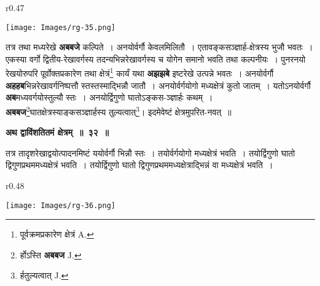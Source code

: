 \documentclass[11pt, openany]{book}
\begin{document}
\begin{wrapfigure}{r}{0.47\textwidth}
\vspace{-10mm}
\begin{center}
\texttt{[image: Images/rg-35.png]}
\end{center}
\vspace{-8mm}
\end{wrapfigure}

तत्र तथा मध्यरेखे \textbf{अबबजे} कल्पिते~। अनयोर्वर्गौ केवलमिलितौ~। एतावङ्कसञ्ज्ञार्ह-क्षेत्रस्य भुजौ भवतः~। एकस्या वर्गो द्वितीय-रेखावर्गस्य तदन्यभिन्नरेखावर्गस्य  च योगेन समानो भवति तथा कल्पनीयः~। पुनरनयो रेखयोरुपरि पूर्वोक्तप्रकारेण तथा क्षेत्रं\renewcommand{\thefootnote}{२}\footnote{पूर्वक्रमप्रकारेण क्षेत्रं {\en A.}} कार्यं यथा \textbf{अझझबे} इष्टरेखे उत्पन्ने भवतः~। अनयोर्वर्गौ \textbf{अहहब}भिन्नरेखावर्गनिष्पत्तौ स्तस्तस्माद्भिन्नौ जातौ~। अनयोर्वर्गयोगो मध्यक्षेत्रं कुतो जातम्~। यतोऽनयोर्वर्गौ \textbf{अब}मध्यवर्गयोस्तुल्यौ स्तः~। अनयोर्द्विगुणो घातोऽङ्कस-ञ्ज्ञार्हः कथम्~। \textbf{अबबज}\renewcommand{\thefootnote}{३}\footnote{र्होऽस्ति \textbf{अबबज} {\en J.}}घातक्षेत्रस्याङ्कसञ्ज्ञार्हस्य तुल्यत्वात्\renewcommand{\thefootnote}{४}\footnote{र्हतुल्यत्वात् {\en J.}}\;। इदमेवेष्टं क्षेत्रमुपरित-नवत्~॥ 
\vspace{2mm}

\begin{center}
\textbf{\large अथ द्वाविंशतितमं क्षेत्रम्~॥~३२~॥}
\end{center}

{\ab  तत्र तादृशरेखाद्वयोत्पादनमिष्टं ययोर्वर्गौ भिन्नौ स्तः~। तयोर्वर्गयोगो मध्यक्षेत्रं भवति~। तयोर्द्विगुणो घातो द्विगुणप्रथममध्यक्षेत्रं भवति~। तयोर्द्विगुणो घातो द्विगुणप्रथममध्यक्षेत्राद्भिन्नं वा मध्यक्षेत्रं भवति~।} 

\newpage

\begin{wrapfigure}{r}{0.48\textwidth}
\vspace{-8mm}
\begin{center}
\texttt{[image: Images/rg-36.png]}
\end{center}
\vspace{-8mm}
\end{wrapfigure}
\end{document}
